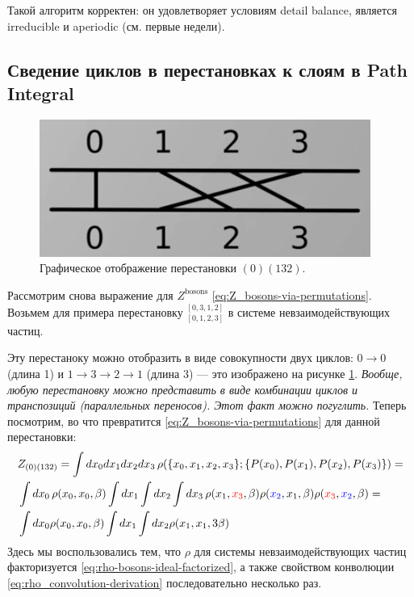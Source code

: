 \begin{lecture}
    Такой алгоритм корректен: он удовлетворяет условиям detail balance, является irreducible и aperiodic (см. первые недели).

    \subsection{Сведение циклов в перестановках к слоям в Path Integral}

    \begin{figure}
        \includegraphics[width=\linewidth]{fig/permutation-cycle}
        \caption{Графическое отображение перестановки $(0)(132)$.}
        \label{fig:permutation-cycle}
    \end{figure}
    Рассмотрим снова выражение для $Z^{\text{bosons}}$ \eqref{eq:Z_bosons-via-permutations}.
    Возьмем для примера перестановку ${}^{[0, 3, 1, 2]}_{[0, 1, 2, 3]}$ в системе невзаимодействующих частиц.

    Эту перестаноку можно отобразить в виде совокупности двух циклов: $0 \rightarrow 0$ (длина 1) и $1 \rightarrow 3 \rightarrow 2 \rightarrow 1$ (длина 3) --- это изображено на рисунке \ref{fig:permutation-cycle}.
    \textit{Вообще, любую перестановку можно представить в виде комбинации циклов и транспозиций (параллельных переносов). Этот факт можно погуглить.}
    Теперь посмотрим, во что превратится \eqref{eq:Z_bosons-via-permutations} для данной перестановки:
    \begin{align}
        \label{eq:Z_0_132-full}
        & Z_{(0)(132)} = \int dx_0 dx_1 dx_2 dx_3\, \rho(\{x_0, x_1, x_2, x_3\}; \{P(x_0), P(x_1), P(x_2), P(x_3)\}) = \\
        \nonumber
        & \int dx_0\, \rho(x_0, x_0, \beta) \int dx_1 \int dx_2 \int dx_3\, \rho(x_1, {\color{red} x_3}, \beta) \rho({\color{blue} x_2}, x_1, \beta) \rho({\color{red} x_3}, {\color{blue} x_2}, \beta) = \\
        \nonumber
        & \int dx_0 \rho(x_0, x_0, \beta) \int dx_1 \int dx_2 \rho(x_1, x_1, 3\beta)
    \end{align}
Здесь мы воспользовались тем, что $\rho$ для системы невзаимодействующих частиц факторизуется \eqref{eq:rho-bosons-ideal-factorized}, а также свойством конволюции \eqref{eq:rho_convolution-derivation} последовательно несколько раз.


\end{lecture}

